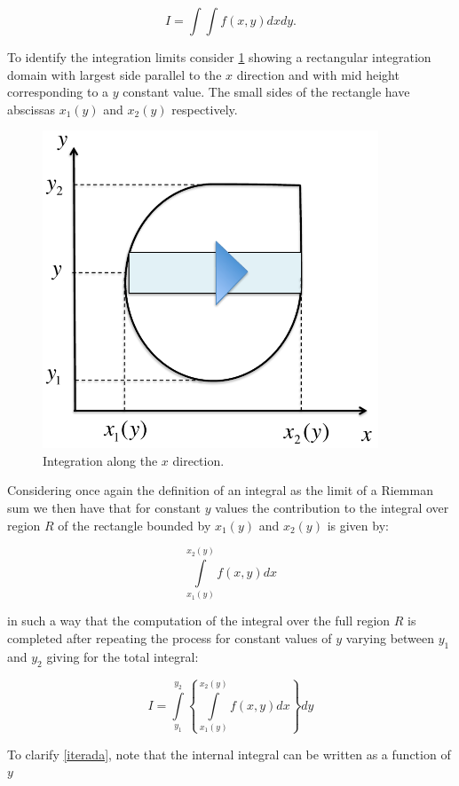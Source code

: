 \[I = \int {\int {f(x,y)dxdy} }. \]

To identify the integration limits consider \cref{fig:dirx} showing a rectangular integration domain with largest side parallel to the $x$ direction and with mid height corresponding to a $y$ constant value. The small sides of the rectangle have abscissas ${x_1}(y)$ and ${x_2}(y)$ respectively.


\begin{figure}[H]
\centering
\includegraphics[width=10cm]{img/dirx.pdf}
\caption{Integration along the $x$ direction.}
\label{fig:dirx}
\end{figure}

Considering once again the definition of an integral as the limit of a Riemman sum we then have that for constant $y$ values the contribution to the integral over region $R$ of the rectangle bounded by ${x_1}(y)$ and ${x_2}(y)$ is given by:



\[\int\limits_{{x_1}(y)}^{{x_2}(y)} {f(x,y)dx}\]

in such a way that the computation of the integral over the full region $R$ is completed after repeating the process for constant values of $y$ varying between $y_1$ and $y_2$ giving for the total integral:


\begin{equation}
I = \int\limits_{{y_1}}^{{y_2}} {\left\{ {\int\limits_{{x_1}(y)}^{{x_2}(y)} {f(x,y)dx} } \right\}dy}
\label{iterada}
\end{equation}


To clarify  \cref{iterada}, note that the internal integral can be written as a function of $y$


